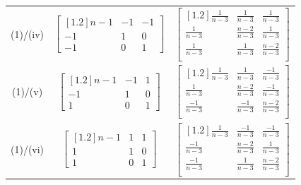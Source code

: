 \documentclass[12pt]{amsart}
\numberwithin{equation}{section}
\theoremstyle{definition}
\begin{document}
{\begin{landscape}
\begin{figure}
\begin{tabular}{ | c | c | c | }
\rule{0pt}{2.5\normalbaselineskip} \\[1.8\normalbaselineskip]
\hline
(1)/(iv)&
$\begin{bmatrix}[1.2]
n-1 & -1 & -1 \\
-1  & 1  & 0  \\
-1  & 0  & 1  
\end{bmatrix}$ & 
$\begin{bmatrix}[1.2]
  \frac{1}{n-3} & \frac{1}{n-3} & \frac{1}{n-3} \\[1mm]
  \frac{1}{n-3}  & \frac{n-2}{n-3}  & \frac{1}{n-3}  \\[1mm]
  \frac{1}{n-3}  & \frac{1}{n-3}  & \frac{n-2}{n-3}  \\[1mm] 
\end{bmatrix} $ 

\rule{0pt}{2.5\normalbaselineskip} \\[1.8\normalbaselineskip]
\hline
(1)/(v)& 
$\begin{bmatrix}[1.2]
n-1 & -1 & 1 \\
-1  & 1  & 0  \\
1  & 0  & 1  
\end{bmatrix}$ & 
$\begin{bmatrix}[1.2]
  \frac{1}{n-3} & \frac{1}{n-3} & \frac{-1}{n-3} \\[1mm]
  \frac{1}{n-3}  & \frac{n-2}{n-3}  & \frac{-1}{n-3}  \\[1mm]
  \frac{-1}{n-3}  & \frac{-1}{n-3}  & \frac{n-2}{n-3}  \\[1mm] 
\end{bmatrix} $ 

\rule{0pt}{2.5\normalbaselineskip} \\[1.8\normalbaselineskip]
\hline
(1)/(vi) &
$\begin{bmatrix}[1.2]
n-1 & 1 & 1 \\
1  & 1  & 0  \\
1  & 0  & 1  
\end{bmatrix}$ & 
$\begin{bmatrix}[1.2]
  \frac{1}{n-3} & \frac{-1}{n-3} & \frac{-1}{n-3} \\[1mm]
  \frac{-1}{n-3}  & \frac{n-2}{n-3}  & \frac{1}{n-3}  \\[1mm]
  \frac{-1}{n-3}  & \frac{1}{n-3}  & \frac{n-2}{n-3} \\[1mm] 
\end{bmatrix} $ 


\end{tabular}
\end{figure}
\end{landscape}}
\end{document}
